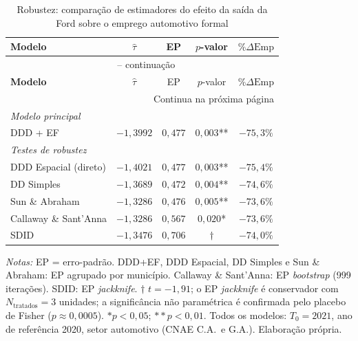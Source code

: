 \documentclass[12pt,a4paper]{article}
\begin{document}
\begin{longtable}{lcccc}
\caption{Robustez: compara\c{c}\~ao de estimadores do efeito da sa\'ida da Ford sobre o emprego automotivo formal}
\label{tab:robustez} \\
\toprule
\textbf{Modelo} & $\hat{\tau}$ & EP & $p$-valor & $\%\Delta\text{Emp}$ \\
\midrule
\endfirsthead
\multicolumn{5}{c}{{\tablename\ \thetable{} -- continua\c{c}\~ao}} \\
\toprule
\textbf{Modelo} & $\hat{\tau}$ & EP & $p$-valor & $\%\Delta\text{Emp}$ \\
\midrule
\endhead
\midrule
\multicolumn{5}{r}{{\footnotesize Continua na pr\'oxima p\'agina}} \\
\endfoot
\bottomrule
\endlastfoot
\textit{Modelo principal} & & & & \\
\quad DDD + EF              & $-1{,}3992$ & $0{,}477$ & $0{,}003$** & $-75{,}3\%$ \\
\midrule
\textit{Testes de robustez} & & & & \\
\quad DDD Espacial (direto) & $-1{,}4021$ & $0{,}477$ & $0{,}003$** & $-75{,}4\%$ \\
\quad DD Simples            & $-1{,}3689$ & $0{,}472$ & $0{,}004$** & $-74{,}6\%$ \\
\quad Sun \& Abraham        & $-1{,}3286$ & $0{,}476$ & $0{,}005$** & $-73{,}6\%$ \\
\quad Callaway \& Sant'Anna & $-1{,}3286$ & $0{,}567$ & $0{,}020$*  & $-73{,}6\%$ \\
\quad SDID                  & $-1{,}3476$ & $0{,}706$ & $\dagger$   & $-74{,}0\%$ \\
\end{longtable}
\noindent\begin{minipage}{0.96\textwidth}
\footnotesize
\textit{Notas:} EP = erro-padr\~ao. DDD+EF, DDD Espacial, DD Simples e Sun \& Abraham: EP agrupado por munic\'ipio. Callaway \& Sant'Anna: EP \textit{bootstrap} (999 itera\c{c}\~oes). SDID: EP \textit{jackknife}. $\dagger$ $t = -1{,}91$; o EP \textit{jackknife} \'e conservador com $N_{\text{tratados}} = 3$ unidades; a signific\^ancia n\~ao param\'etrica \'e confirmada pelo placebo de Fisher ($p \approx 0{,}0005$). $*p < 0{,}05$; $**p < 0{,}01$. Todos os modelos: $T_0 = 2021$, ano de refer\^encia 2020, setor automotivo (CNAE C.A.\ e G.A.). Elabora\c{c}\~ao pr\'opria.
\end{minipage}
\vspace{0.5\baselineskip}
\end{document}
